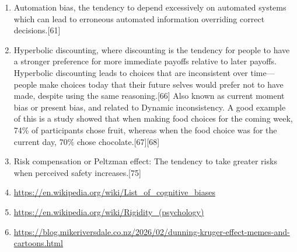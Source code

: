 \documentclass[11pt]{article}
\begin{document}
\begin{enumerate}
\label{sec:orgd364141}
\item Automation bias, the tendency to depend excessively on automated systems which can lead to erroneous automated information overriding correct decisions.[61]
\label{sec:org693ed6a}
\item Hyperbolic discounting, where discounting is the tendency for people to have a stronger preference for more immediate payoffs relative to later payoffs. Hyperbolic discounting leads to choices that are inconsistent over time—people make choices today that their future selves would prefer not to have made, despite using the same reasoning.[66] Also known as current moment bias or present bias, and related to Dynamic inconsistency. A good example of this is a study showed that when making food choices for the coming week, 74\% of participants chose fruit, whereas when the food choice was for the current day, 70\% chose chocolate.[67][68]
\label{sec:org96bc06e}
\item Risk compensation or Peltzman effect: The tendency to take greater risks when perceived safety increases.[75]
\label{sec:org8d82b24}
\item \url{https://en.wikipedia.org/wiki/List\_of\_cognitive\_biases}
\label{sec:org8ff1a6e}
\item \url{https://en.wikipedia.org/wiki/Rigidity\_(psychology)}
\label{sec:orgec20b90}
\item \url{https://blog.mikeriversdale.co.nz/2026/02/dunning-kruger-effect-memes-and-cartoons.html}
\label{sec:org309bdde}
\end{enumerate}
\end{document}
